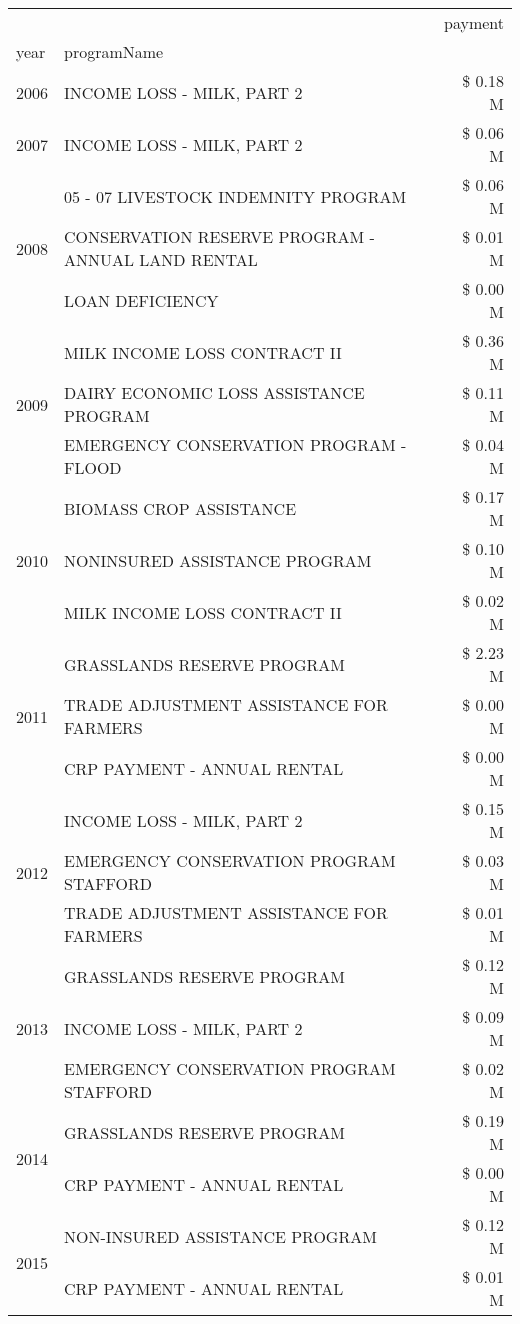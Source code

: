 \begin{tabular}{llr}
\toprule
 &  & payment \\
year & programName &  \\
\midrule
2006 & INCOME LOSS - MILK, PART 2 & \$ 0.18 M \\
\cline{1-3}
2007 & INCOME LOSS - MILK, PART 2 & \$ 0.06 M \\
\cline{1-3}
\multirow[t]{3}{*}{2008} & 05 - 07 LIVESTOCK INDEMNITY PROGRAM & \$ 0.06 M \\
 & CONSERVATION RESERVE PROGRAM - ANNUAL LAND RENTAL & \$ 0.01 M \\
 & LOAN DEFICIENCY & \$ 0.00 M \\
\cline{1-3}
\multirow[t]{3}{*}{2009} & MILK INCOME LOSS CONTRACT II & \$ 0.36 M \\
 & DAIRY ECONOMIC LOSS ASSISTANCE PROGRAM & \$ 0.11 M \\
 & EMERGENCY CONSERVATION PROGRAM - FLOOD & \$ 0.04 M \\
\cline{1-3}
\multirow[t]{3}{*}{2010} & BIOMASS CROP ASSISTANCE & \$ 0.17 M \\
 & NONINSURED ASSISTANCE PROGRAM & \$ 0.10 M \\
 & MILK INCOME LOSS CONTRACT II & \$ 0.02 M \\
\cline{1-3}
\multirow[t]{3}{*}{2011} & GRASSLANDS RESERVE PROGRAM & \$ 2.23 M \\
 & TRADE ADJUSTMENT ASSISTANCE FOR FARMERS & \$ 0.00 M \\
 & CRP PAYMENT - ANNUAL RENTAL & \$ 0.00 M \\
\cline{1-3}
\multirow[t]{3}{*}{2012} & INCOME LOSS - MILK, PART 2 & \$ 0.15 M \\
 & EMERGENCY CONSERVATION PROGRAM STAFFORD & \$ 0.03 M \\
 & TRADE ADJUSTMENT ASSISTANCE FOR FARMERS & \$ 0.01 M \\
\cline{1-3}
\multirow[t]{3}{*}{2013} & GRASSLANDS RESERVE PROGRAM & \$ 0.12 M \\
 & INCOME LOSS - MILK, PART 2 & \$ 0.09 M \\
 & EMERGENCY CONSERVATION PROGRAM STAFFORD & \$ 0.02 M \\
\cline{1-3}
\multirow[t]{2}{*}{2014} & GRASSLANDS RESERVE PROGRAM & \$ 0.19 M \\
 & CRP PAYMENT - ANNUAL RENTAL & \$ 0.00 M \\
\cline{1-3}
\multirow[t]{3}{*}{2015} & NON-INSURED ASSISTANCE PROGRAM & \$ 0.12 M \\
 & CRP PAYMENT - ANNUAL RENTAL & \$ 0.01 M \\

\end{tabular}
